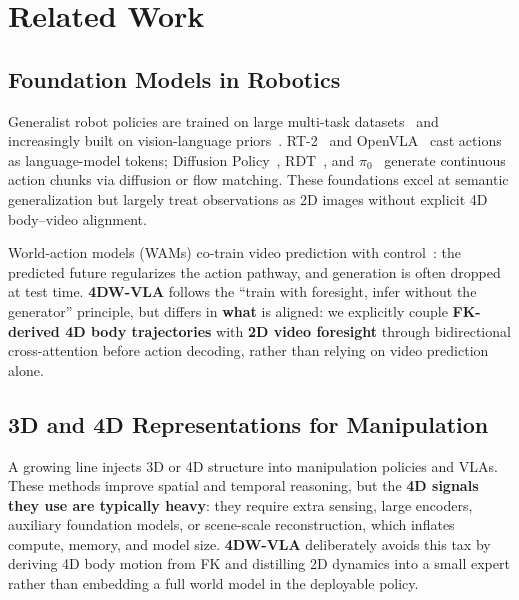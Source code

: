 \section{Related Work}
\label{sec:related}

\subsection{Foundation Models in Robotics}

Generalist robot policies are trained on large multi-task datasets~\cite{walke2023bridge,khazatsky2024droid,vuong2023oxe} and increasingly built on vision-language priors~\cite{rt2,kim2024openvla,black2024pi0,liu2024rdt}. RT-2~\cite{rt2} and OpenVLA~\cite{kim2024openvla} cast actions as language-model tokens; Diffusion Policy~\cite{chi2023diffusion}, RDT~\cite{liu2024rdt}, and $\pi_0$~\cite{black2024pi0} generate continuous action chunks via diffusion or flow matching. These foundations excel at semantic generalization but largely treat observations as 2D images without explicit 4D body--video alignment.

World-action models (WAMs) co-train video prediction with control~\cite{nvidia2026wam,lawam2026,dreaming2026}: the predicted future regularizes the action pathway, and generation is often dropped at test time. \textbf{4DW-VLA} follows the ``train with foresight, infer without the generator'' principle, but differs in \textbf{what} is aligned: we explicitly couple \textbf{FK-derived 4D body trajectories} with \textbf{2D video foresight} through bidirectional cross-attention before action decoding, rather than relying on video prediction alone.

\subsection{3D and 4D Representations for Manipulation}

A growing line injects 3D or 4D structure into manipulation policies and VLAs. These methods improve spatial and temporal reasoning, but the \textbf{4D signals they use are typically heavy}: they require extra sensing, large encoders, auxiliary foundation models, or scene-scale reconstruction, which inflates compute, memory, and model size. \textbf{4DW-VLA} deliberately avoids this tax by deriving 4D body motion from FK and distilling 2D dynamics into a small expert rather than embedding a full world model in the deployable policy.

